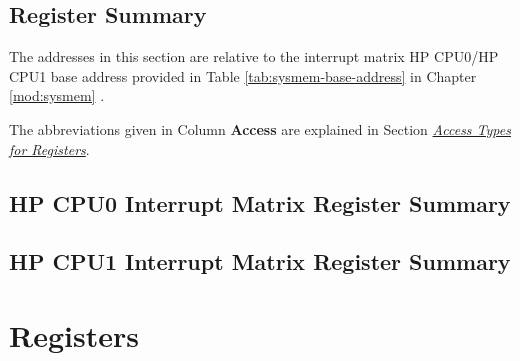 \documentclass[main\_\_EN.tex]{subfiles}
\begin{document}












\newpage
\hypertarget{intmtrx-reg-summ}{}
\begin{landscape}
\section{Register Summary}
\label{sec:{intmtrx--reg-summ}}

The addresses in this section are relative to the interrupt matrix HP CPU0/HP CPU1 base address provided in Table \ref{tab:sysmem-base-address} in Chapter \ref{mod:sysmem} \textit{}.

The abbreviations given in Column \textbf{Access} are explained in Section \hyperref[glossary-access-types]{\textit{Access Types for Registers}}.


\subsection{HP CPU0 Interrupt Matrix Register Summary}
\label{sec: cpu0-intmtrx-reg-summ}



\subsection{HP CPU1 Interrupt Matrix Register Summary}
\label{sec: cpu1-intmtrx-reg-summ}


\end{landscape}





\newpage
\section{Registers}
\end{document}
